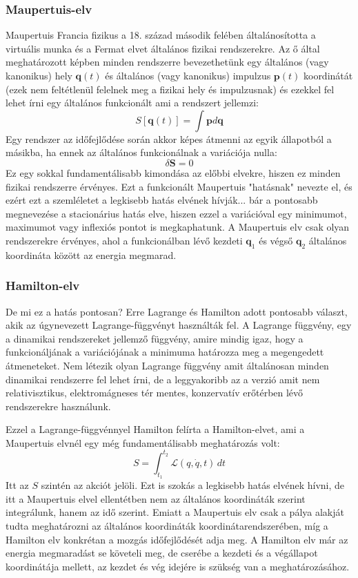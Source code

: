 \documentclass[../main.tex]{subfiles}
\begin{document}
\subsubsection*{Maupertuis-elv}
Maupertuis Francia fizikus a 18. század második felében általánosította a virtuális munka és a Fermat elvet általános fizikai rendszerekre. Az ő által meghatározott képben minden rendszerre bevezethetünk egy általános (vagy kanonikus) hely $\mathbf{q}(t)$ és általános (vagy kanonikus) impulzus $\mathbf{p}(t)$ koordinátát (ezek nem feltétlenül felelnek meg a fizikai hely és impulzusnak) és ezekkel fel lehet írni egy általános funkcionált ami a rendszert jellemzi:
\begin{equation}
    S[\mathbf{q}(t)] = \int \mathbf{p} d\mathbf{q}
\end{equation}
Egy rendszer az időfejlődése során akkor képes átmenni az egyik állapotból a másikba, ha ennek az általános funkcionálnak a variációja nulla:
\begin{equation}
    \delta \mathbf{S} = 0
\end{equation}
Ez egy sokkal fundamentálisabb kimondása az előbbi elvekre, hiszen ez minden fizikai rendszerre érvényes. Ezt a funkcionált Maupertuis "hatásnak" nevezte el, és ezért ezt a szemléletet a legkisebb hatás elvének hívják... bár a pontosabb megnevezése a stacionárius hatás elve, hiszen ezzel a variációval egy minimumot, maximumot vagy inflexiós pontot is megkaphatunk. A Maupertuis elv csak olyan rendszerekre érvényes, ahol a funkcionálban lévő kezdeti $\mathbf{q}_1$ és végső $\mathbf{q}_2$ általános koordináta között az energia megmarad. 


\subsubsection*{Hamilton-elv}
De mi ez a hatás pontosan? Erre Lagrange és Hamilton adott pontosabb választ, akik az úgynevezett Lagrange-függvényt használták fel. A Lagrange függvény, egy a dinamikai rendszereket jellemző függvény, amire mindig igaz, hogy a funkcionáljának a variációjának a minimuma határozza meg a megengedett átmeneteket. Nem létezik olyan Lagrange függvény amit általánosan minden dinamikai rendszerre fel lehet írni, de a leggyakoribb az a verzió amit nem relativisztikus, elektromágneses tér mentes, konzervatív erőtérben lévő rendszerekre használunk. 

Ezzel a Lagrange-függvénnyel Hamilton felírta a Hamilton-elvet, ami a Maupertuis elvnél egy még fundamentálisabb meghatározás volt:
\begin{equation}
    S = \int_{t_1}^{t_2} \mathcal{L}(q, \dot{q}, t) \, dt
\end{equation}
Itt az $S$ szintén az akciót jelöli. Ezt is szokás a legkisebb hatás elvének hívni, de itt a Maupertuis elvel ellentétben nem az általános koordináták szerint integrálunk, hanem az idő szerint. Emiatt a Maupertuis elv csak a pálya alakját tudta meghatározni az általános koordináták koordinátarendszerében, míg a Hamilton elv konkrétan a mozgás időfejlődését adja meg. A Hamilton elv már az energia megmaradást se követeli meg, de cserébe a kezdeti és a végállapot koordinátája mellett, az kezdet és vég idejére is szükség van a meghatározásához.
\end{document}
